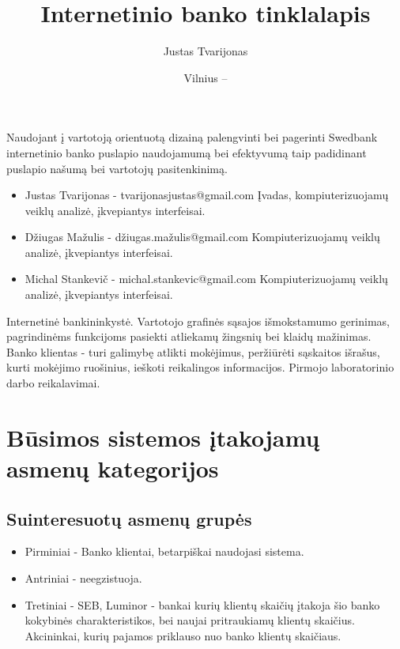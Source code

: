 \documentclass{VUMIFPSkursinis}
\title{Internetinio banko tinklalapis}
\author{Justas Tvarijonas}
\date{Vilnius – \the\year}
\begin{document}
\maketitle
{}
Naudojant į vartotoją orientuotą dizainą palengvinti bei pagerinti Swedbank internetinio banko puslapio naudojamumą bei efektyvumą taip padidinant puslapio našumą bei vartotojų pasitenkinimą.
\begin{itemize}
	\item Justas Tvarijonas - tvarijonasjustas@gmail.com \newline
	Įvadas, kompiuterizuojamų veiklų analizė, įkvepiantys interfeisai.
	\item Džiugas Mažulis - džiugas.mažulis@gmail.com \newline 
	Kompiuterizuojamų veiklų analizė, įkvepiantys interfeisai.
	\item Michal Stankevič - michal.stankevic@gmail.com \newline
	 Kompiuterizuojamų veiklų analizė, įkvepiantys interfeisai.
\end{itemize}
\tableofcontents
{}
Internetinė bankininkystė.
Vartotojo grafinės sąsajos išmokstamumo gerinimas, pagrindinėms funkcijoms pasiekti atliekamų žingsnių bei klaidų mažinimas.
Banko klientas - turi galimybę atlikti mokėjimus, peržiūrėti sąskaitos išrašus, kurti mokėjimo ruošinius, ieškoti reikalingos informacijos.
Pirmojo laboratorinio darbo reikalavimai.
\section{Būsimos sistemos įtakojamų asmenų kategorijos}
\subsection{Suinteresuotų asmenų grupės}
\begin{itemize}
	\item Pirminiai - Banko klientai, betarpiškai naudojasi sistema.
	\item Antriniai - neegzistuoja.
	\item Tretiniai - SEB, Luminor - bankai kurių klientų skaičių įtakoja šio banko kokybinės charakteristikos, bei naujai pritraukiamų klientų skaičius. Akcininkai, kurių pajamos priklauso nuo banko klientų skaičiaus.
\end{itemize}
\end{document}
